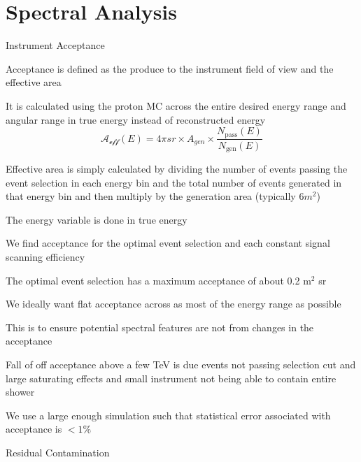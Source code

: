 \documentclass{article}
\begin{document}
\section{Spectral Analysis}
	\begin{myEnumerate}
		\item Instrument Acceptance
		\begin{myEnumerate}
			\item Acceptance is defined as the produce to the instrument field of view and the effective area
			\item It is calculated using the proton MC across the entire desired energy range and angular range in true energy instead of reconstructed energy
			\begin{equation}
			\mathscr{A_{eff}}(E) = 4\pi sr \times A_{gen} \times \frac{N_\text{pass}(E)}{N_\text{gen}(E)} 
			\end{equation}
			\begin{myEnumerate}
				\item Effective area is simply calculated by dividing the number of events passing the event selection in each energy bin and the total number of events generated in that energy bin and then multiply by the generation area (typically $6m^2$)
				\item The energy variable is done in true energy
			\end{myEnumerate}
			\item We find acceptance for the optimal event selection and each constant signal scanning efficiency
			\begin{myEnumerate}
				\item The optimal event selection has a maximum acceptance of about 0.2 m$^2$ sr
				\item We ideally want flat acceptance across as most of the energy range as possible
				\item This is to ensure potential spectral features are not from changes in the acceptance
				\item Fall of off acceptance above a few TeV is due events not passing selection cut and large saturating effects and small instrument not being able to contain entire shower
			\end{myEnumerate}
			\item We use a large enough simulation such that statistical error associated with acceptance is $<1\%$
		\end{myEnumerate}
		\item Residual Contamination
		\begin{myEnumerate}

\end{myEnumerate}
\end{myEnumerate}
\end{document}
